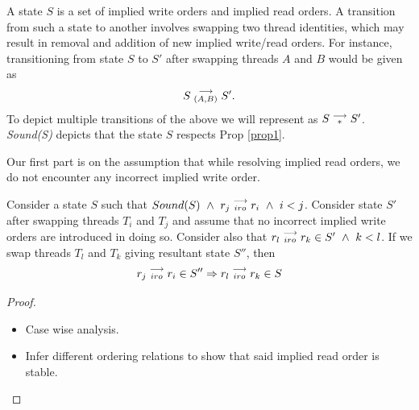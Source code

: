         A state $S$ is a set of implied write orders and implied read orders.
        A transition from such a state to another involves swapping two thread identities, which may result in removal and addition of new implied write/read orders.
        For instance, transitioning from state $S$ to $S'$ after swapping threads $A$ and $B$ would be given as 
        \begin{align*}
            S\stackrel{\longrightarrow}{_{(A,B)}}S'.
        \end{align*}
        To depict multiple transitions of the above we will represent as $S\stackrel{\longrightarrow}{_{*}}S'$.
        \textit{Sound(S)}  depicts that the state $S$ respects Prop \ref{prop1}.
        
        

        Our first part is on the assumption that while resolving implied read orders, we do not encounter any incorrect implied write order. 
        \begin{lemma}
            \label{iro-stability}
            Consider a state $S$ such that $Sound(S) \ \wedge \ \reln{r_j}{iro}{r_i} \ \wedge \ i < j$.
            Consider state $S'$ after swapping threads $T_i$ and $T_j$ and assume that no incorrect implied write orders are introduced in doing so. 
            Consider also that $r_l\stackrel{\longrightarrow}{_{iro}}r_k \in S' \ \wedge \ k < l$.
            If we swap threads $T_l$ and $T_k$ giving resultant state $S''$, then 
            \begin{align*}
                r_j\stackrel{\longrightarrow}{_{iro}}r_i \in S'' 
                \Rightarrow
                r_l\stackrel{\longrightarrow}{_{iro}}r_k \in S
            \end{align*} 
        \end{lemma}

        \begin{proof}


            \begin{itemize}
                \item Case wise analysis.
                \item Infer different ordering relations to show that said implied read order is stable.
            \end{itemize}

        \end{proof}


